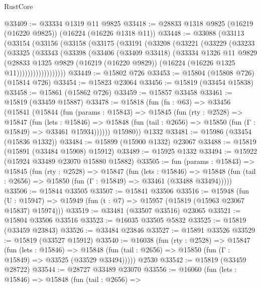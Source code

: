 \begin{lexlean}{RustCore}
\begin{coremodule}
@33409 := @33334 @1319 @11 @9825
@33418 := @28833 @1318 @9825 (@16219 (@16220 @9825)) (@16224 (@16226 @1318 @11))
@33448 := @33088
    (@33113
      (@33154
        (@33156
          (@33158
            (@33175
              (@33191
                (@33208
                  (@33221
                    (@33229
                      (@33233
                        (@33325
                          (@33343
                            (@33398
                              (@33406
                                (@33409 @33418)
                                (@33334
                                  @1326
                                  @11
                                  @9829
                                  (@28833
                                    @1325
                                    @9829
                                    (@16219 (@16220 @9829))
                                    (@16224 (@16226 @1325 @11))))))))))))))))))
@33449 := @15802 @726
@33453 := @15804 (@15808 @726) (@15814 @726)
@33454 := @15823 @23064
@33456 := @15819 (@33454 @15838)
@33458 := @15861 (@15862 @726)
@33459 := @15857 @33458
@33461 := @15819 (@33459 @15887)
@33478 := @15818
    (fun (fn : @63) =>
    @33456
      (@15841
        (@15844
          (fun (params : @15843) =>
          @15845
            (fun (rty : @2528) =>
            @15847
              (fun (lets : @15846) =>
              @15848 (fun (tail : @2656) => @15850 (fun (Γ : @15849) => @33461 @15934))))))
        @15980))
    @1332
@33481 := @15986 (@33454 (@15836 @1332))
@33484 := @15899 (@15900 @1332) @23067
@33488 := @15819 (@15891 (@33484 @15908) @15912)
@33489 := @15925 @1332
@33494 := @15922 (@15924 @33489 @23070 @15880 @15882)
@33505 := fun (params : @15843) =>
  @15845
    (fun (rty : @2528) =>
    @15847
      (fun (lets : @15846) =>
      @15848 (fun (tail : @2656) => @15850 (fun (Γ : @15849) => @33461 (@33488 @33494)))))
@33506 := @15844 @33505
@33507 := @15841 @33506
@33516 := @15948
    (fun (U : @15947) => @15949 (fun (t : @7) => @15957 (@15819 (@15963 @23067 @15837) @15974)))
@33519 := @33481 (@33507 @33516) @23065
@33521 := @15804 @33506 @33516
@33523 := @16035 @33505 @5832
@33525 := @15819 (@33459 @23843)
@33526 := @33484 @23846
@33527 := @15891 @33526
@33529 := @15819 (@33527 @15912)
@33540 := @16038
    (fun (rty : @2528) =>
    @15847
      (fun (lets : @15846) =>
      @15848 (fun (tail : @2656) => @15850 (fun (Γ : @15849) => @33525 (@33529 @33494)))))
    @2530
@33542 := @15819 (@33459 @28722)
@33544 := @28727 @33489 @23070
@33556 := @16060
    (fun (lets : @15846) =>
    @15848
      (fun (tail : @2656) =>

\end{coremodule}
\end{lexlean}

